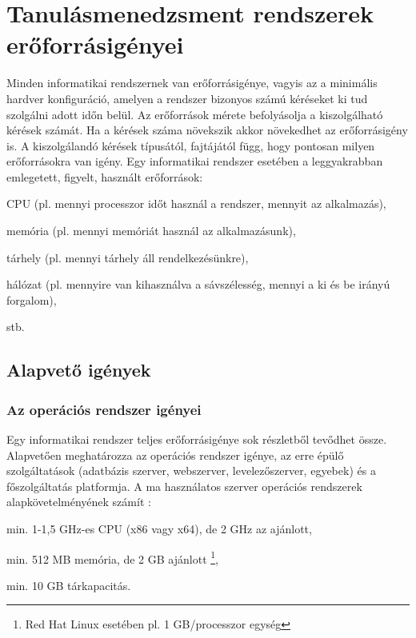 \chapter{Tanulásmenedzsment rendszerek erőforrásigényei}

Minden informatikai rendszernek van erőforrásigénye, vagyis az a minimális hardver konfiguráció, amelyen a rendszer bizonyos számú kéréseket ki tud szolgálni adott időn belül. Az erőforrások mérete befolyásolja a kiszolgálható kérések számát. Ha a kérések száma növekszik akkor növekedhet az erőforrásigény is. A kiszolgálandó kérések típusától, fajtájától függ, hogy pontosan milyen erőforrásokra van igény.
Egy informatikai rendszer esetében a leggyakrabban emlegetett, figyelt, használt erőforrások:
\begin{sajat_itemize}
\item CPU (pl. mennyi processzor időt használ a rendszer, mennyit az alkalmazás),
\item memória (pl. mennyi memóriát használ az alkalmazásunk),
\item tárhely (pl. mennyi tárhely áll rendelkezésünkre),
\item hálózat (pl. mennyire van kihasználva a sávszélesség, mennyi a ki és be irányú forgalom),
\item stb.
\end{sajat_itemize}

\section{Alapvető igények}

\subsection{Az operációs rendszer igényei}
Egy informatikai rendszer teljes erőforrásigénye sok részletből tevődhet össze. Alapvetően meghatározza az operációs rendszer igénye, az erre épülő szolgáltatások (adatbázis szerver, webszerver, levelezőszerver, egyebek) és a főszolgáltatás platformja.
A ma használatos szerver operációs rendszerek alapkövetelményének számít \cite{ws2008sr,ubuntuminhr,redhatcaplim}:

\begin{sajat_itemize}
\item min. 1-1,5 GHz-es CPU (x86 vagy x64), de 2 GHz az ajánlott,
\item min. 512 MB memória, de 2 GB ajánlott \footnote{Red Hat Linux esetében pl. 1 GB/processzor egység},
\item min. 10 GB tárkapacitás.
\end{sajat_itemize}

